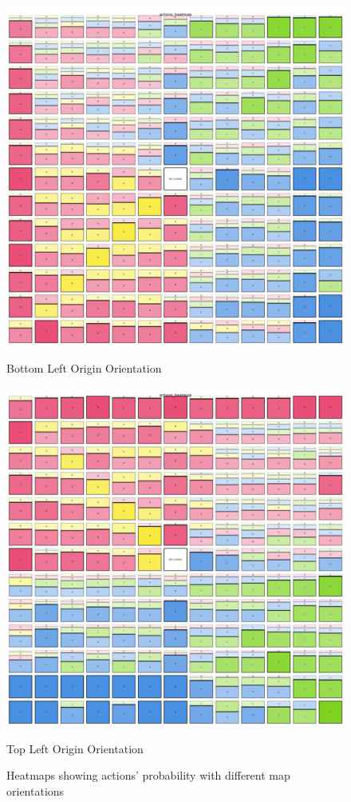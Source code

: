 \begin{figure}[h]
  \centering
  \begin{minipage}[b]{0.45\textwidth}
    \centering
    \includegraphics[width=\textwidth]{
      images/results_discussion/actions_heatmapBL.png
    }
    \caption{Bottom Left Origin Orientation}
    \label{fig:heatmapBL}
  \end{minipage}
  \hfill
  \begin{minipage}[b]{0.45\textwidth}
    \centering
    \includegraphics[width=\textwidth]{
      images/results_discussion/actions_heatmapTL.png
    }
    \caption{Top Left Origin Orientation}
    \label{fig:heatmapTL}
  \end{minipage}
  \caption{Heatmaps showing actions' probability with different map orientations}
  \label{fig:orientation}
\end{figure}


